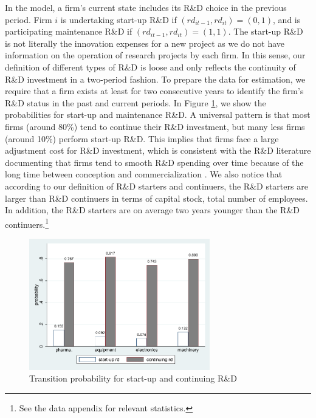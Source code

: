 \documentclass[11pt]{article}
\begin{document}
In the model, a firm's current state includes its R\&D choice in the previous period.  Firm $i$ is undertaking start-up R\&D if $(rd_{it-1}, rd_{it})=(0, 1)$, and is participating maintenance R\&D if $(rd_{it-1}, rd_{it})=(1, 1)$. The start-up R\&D is not literally the innovation expenses for a new project as we do not have information on the operation of research projects by each firm. In this sense, our definition of different types of R\&D is loose and only reflects the continuity of R\&D investment in a two-period fashion. To prepare the data for estimation, we require that a firm exists at least for two consecutive years to identify the firm's R\&D status in the past and current periods. In Figure \ref{fig:rd_transition}, we show the probabilities for start-up and maintenance R\&D. A universal pattern is that most firms (around 80\%) tend to continue their R\&D investment, but many less firms (around 10\%) perform start-up R\&D. This implies that firms face a large adjustment cost for R\&D investment, which is consistent with the R\&D literature documenting that firms tend to smooth R\&D spending over time because of the long time between conception and commercialization \citep{hall1986patents,lach1989dynamics, hall2010handbook}. We also notice that according to our definition of R\&D starters and continuers, the R\&D starters are larger than R\&D continuers in terms of capital stock, total number of employees. In addition, the R\&D starters are on average two years younger than the R\&D continuers.\footnote{See the data appendix for relevant statistics.} 

\begin{figure}[h]
    \centering
    \caption{Transition probability for start-up and continuing R\&D}
    \label{fig:rd_transition}
    \includegraphics[width=0.7\textwidth]{Figs/rd_prob_transition.pdf}
\end{figure}
\end{document}
